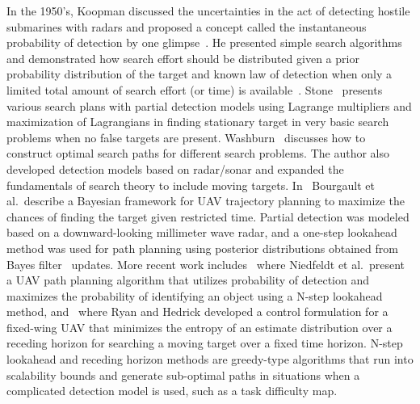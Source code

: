 \documentclass[journal]{IEEEtran}
\begin{document}
In the 1950's, Koopman discussed the uncertainties in the act of detecting hostile submarines with radars and proposed a concept called the instantaneous probability of detection by one glimpse~\cite{koopman1956theory}. He presented simple search algorithms and demonstrated how search effort should be distributed given a prior probability distribution of the target and known law of detection when only a limited total amount of search effort (or time) is available~\cite{koopman1957theory}. Stone~\cite{stone1975theory} presents various search plans with partial detection models using Lagrange multipliers and maximization of Lagrangians in finding stationary target in very basic search problems when no false targets are present. Washburn~\cite{washburn1981search} discusses how to construct optimal search paths for different search problems. The author also developed detection models based on radar/sonar and expanded the fundamentals of search theory to include moving targets. In~\cite{Bourgault2006} Bourgault et al.\ describe a Bayesian framework for UAV trajectory planning to maximize the chances of finding the target given restricted time. Partial detection was modeled based on a downward-looking millimeter wave radar, and a one-step lookahead method was used for path planning using posterior distributions obtained from Bayes filter~\cite{thrun2005probabilistic} updates. More recent work includes~\cite{niedfeldt2010integrated} where Niedfeldt et al.\ present a UAV path planning algorithm that utilizes probability of detection and maximizes the probability of identifying an object using a N-step lookahead method, and~\cite{ryan2010particle} where Ryan and Hedrick developed a control formulation for a fixed-wing UAV that minimizes the entropy of an estimate distribution over a receding horizon for searching a moving target over a fixed time horizon. N-step lookahead and receding horizon methods are greedy-type algorithms that run into scalability bounds and generate sub-optimal paths in situations when a complicated detection model is used, such as a task difficulty map.
\end{document}
